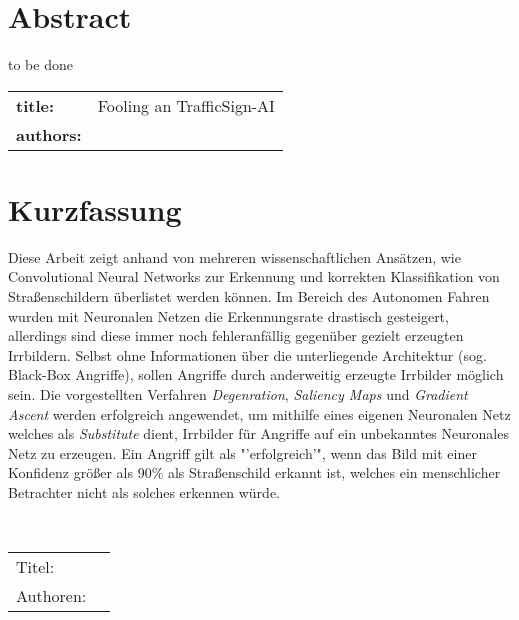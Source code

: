 \chapter*{Abstract} %
to be done
~\newline
~\newline
\begin{flushleft}
	\begin{tabular}{lp{11cm}}
		\textbf{title:} & Fooling an TrafficSign-AI \\
		\textbf{authors:}  & \autor \\
		
	\end{tabular} 
\end{flushleft}


\chapter*{Kurzfassung} 
Diese Arbeit zeigt anhand von mehreren wissenschaftlichen Ansätzen, wie Convolutional Neural Networks zur Erkennung und korrekten Klassifikation von Straßenschildern überlistet werden können.
Im Bereich des Autonomen Fahren wurden mit Neuronalen Netzen die Erkennungsrate drastisch gesteigert, allerdings sind diese immer noch fehleranfällig gegenüber gezielt erzeugten Irrbildern. Selbst ohne Informationen über die unterliegende Architektur (sog. Black-Box Angriffe), sollen Angriffe durch anderweitig erzeugte Irrbilder möglich sein.
Die vorgestellten Verfahren \textit{Degenration}, \textit{Saliency Maps} und \textit{Gradient Ascent} werden erfolgreich angewendet, um mithilfe eines eigenen Neuronalen Netz welches als \textit{Substitute} dient, Irrbilder für Angriffe auf ein unbekanntes Neuronales Netz zu erzeugen.
Ein Angriff gilt als "'erfolgreich'", wenn das Bild mit einer Konfidenz größer als 90\% als Straßenschild erkannt ist, welches ein menschlicher Betrachter nicht als solches erkennen würde.

~\newline
\begin{flushleft}
	\begin{tabular}{lp{11cm}}
		Titel:&  \titel \\ 
		Authoren:&  \autor \\
	\end{tabular} 
\end{flushleft}
